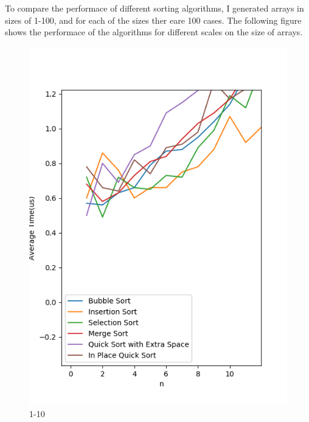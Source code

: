 \documentclass{article}
\begin{document}
To compare the performace of different sorting algorithms, I generated arrays in sizes of 1-100, and for each of the sizes ther eare 100 cases. The following figure shows the performace of the algorithms for different scales on the size of arrays.

\begin{figure}[htbp]
    \begin{minipage}[t]{0.3\textwidth}
        \centering
        \includegraphics[width=\textwidth]{zero_ten.png}
        \caption{1-10}
    \end{minipage}
    \begin{minipage}[t]{0.35\textwidth}
        \centering

\end{minipage}
\end{figure}
\end{document}
